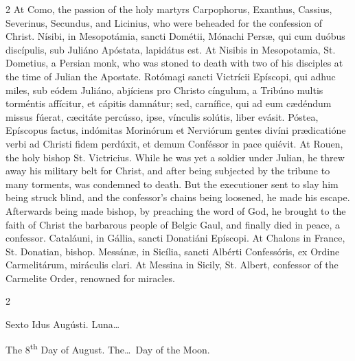 \begin{paracol}{2}
\switchcolumn
{}
At Como, the passion of the holy 
 martyrs Carpophorus, Exanthus, Cassius, Severinus, Secundus, and Licinius, 
 who were beheaded for the confession of Christ.
\switchcolumn*
{}
Nísibi, in Mesopotámia, sancti Dométii, Mónachi Persæ, qui cum duóbus discípulis, sub Juliáno Apóstata, lapidátus est.
\switchcolumn
{}
At Nisibis in Mesopotamia, St. 
 Dometius, a Persian monk, who was stoned to death with two of his disciples 
 at the time of Julian the Apostate.
\switchcolumn*
{}
Rotómagi sancti 
 Victrícii Epíscopi, qui adhuc miles, sub eódem Juliáno, abjíciens pro 
 Christo cíngulum, a Tribúno multis torméntis affícitur, et cápitis damnátur; 
 sed, carnífice, qui ad eum cædéndum missus fúerat, cæcitáte percússo, ipse, 
 vínculis solútis, liber evásit. Póstea, Epíscopus factus, indómitas 
 Morinórum et Nerviórum gentes divíni prædicatióne verbi ad Christi fidem 
 perdúxit, et demum Conféssor in pace quiévit.
\switchcolumn
{}
At Rouen, the holy bishop St. 
 Victricius. While he was yet a soldier under Julian, he threw away his 
 military belt for Christ, and after being subjected by the tribune to many 
 torments, was condemned to death. But the executioner sent to slay him 
 being struck blind, and the confessor's chains being loosened, he made his 
 escape. Afterwards being made bishop, by preaching the word of God, he 
 brought to the faith of Christ the barbarous people of Belgic Gaul, and 
 finally died in peace, a confessor.
\switchcolumn*
{}
Cataláuni, in Gállia, 
 sancti Donatiáni Epíscopi.
\switchcolumn
{}
At Chalons in France, St. Donatian, 
 bishop.
\switchcolumn*
{}
Messánæ, in Sicília, 
 sancti Albérti Confessóris, ex Ordine Carmelitárum, miráculis clari.
\switchcolumn
{}
At Messina in Sicily, St. Albert, 
 confessor of the Carmelite Order, renowned for miracles.
\switchcolumn*
{}
\end{paracol}


\begin{paracol}{2}
\begin{center}{\color{gregoriocolor} Sexto Idus Augústi. 
 Luna\dots\ }\end{center}
\switchcolumn
{}
\begin{center}{\color{gregoriocolor} The 8\textsuperscript{th} Day of 
 August. The\dots\ Day of the Moon.}\end{center}
\end{paracol}

